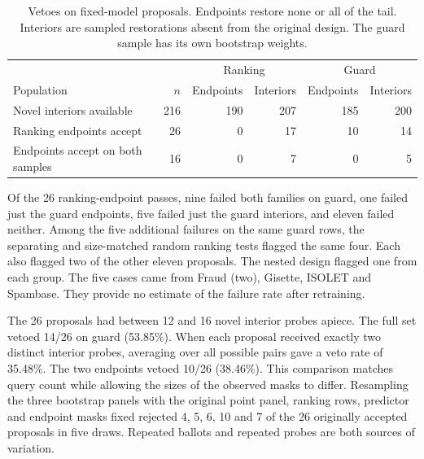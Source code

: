 \begin{table}[tb]
\centering
\caption{Vetoes on fixed-model proposals. Endpoints restore none or all of the tail. Interiors are sampled restorations absent from the original design. The guard sample has its own bootstrap weights.}
\label{tab:crossed}
\small
\begin{tabular}{lrrrrr}
\toprule
& & \multicolumn{2}{c}{Ranking} & \multicolumn{2}{c}{Guard}\\
Population & $n$ & Endpoints & Interiors & Endpoints & Interiors\\
\midrule
Novel interiors available &216&190&207&185&200\\
Ranking endpoints accept &26&0&17&10&14\\
Endpoints accept on both samples &16&0&7&0&5\\
\bottomrule
\end{tabular}
\end{table}

Of the 26 ranking-endpoint passes, nine failed both families on guard, one failed just the guard endpoints, five failed just the guard interiors, and eleven failed neither. Among the five additional failures on the same guard rows, the separating and size-matched random ranking tests flagged the same four. Each also flagged two of the other eleven proposals. The nested design flagged one from each group. The five cases came from Fraud (two), Gisette, ISOLET and Spambase. They provide no estimate of the failure rate after retraining.

The 26 proposals had between 12 and 16 novel interior probes apiece. The full set vetoed 14/26 on guard (53.85\%). When each proposal received exactly two distinct interior probes, averaging over all possible pairs gave a veto rate of 35.48\%. The two endpoints vetoed 10/26 (38.46\%). This comparison matches query count while allowing the sizes of the observed masks to differ. Resampling the three bootstrap panels with the original point panel, ranking rows, predictor and endpoint masks fixed rejected 4, 5, 6, 10 and 7 of the 26 originally accepted proposals in five draws. Repeated ballots and repeated probes are both sources of variation.
